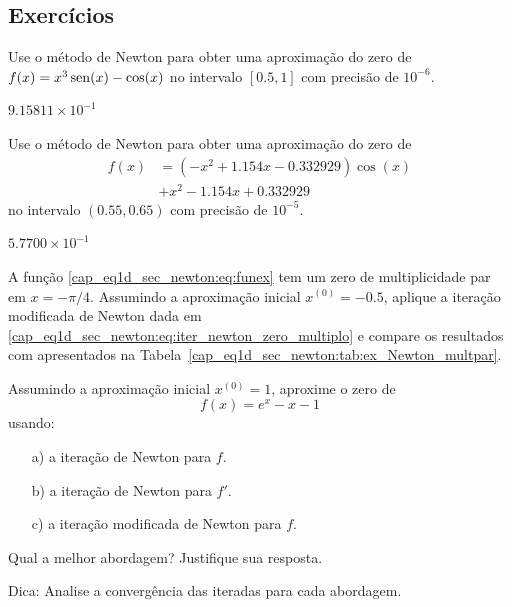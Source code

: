 \subsection*{Exercícios}

\begin{exer}\label{exer:Newton_1}
  Use o método de Newton para obter uma aproximação do zero de $f(x)=x^3\operatorname{sen}(x)-\cos(x)$ no intervalo $[0.5, 1]$ com precisão de $10^{-6}$.
\end{exer}
\begin{resp}
  $9.15811\times 10^{-1}$
\end{resp}

\begin{exer}\label{exer:Newton_multpar}
  Use o método de Newton para obter uma aproximação do zero de
  \begin{equation}
    \begin{aligned}
      f(x) &= (-x^2+1.154x-0.332929)\cos(x) \\
           &+ x^2 - 1.154x + 0.332929
    \end{aligned}
\end{equation}
no intervalo $(0.55, 0.65)$ com precisão de $10^{-5}$.
\end{exer}
\begin{resp}
  $5.7700\times 10^{-1}$
\end{resp}

\begin{exer}\label{cap_eq1d_sec_newton:exer:iter_newton_zeros_multiplos}
  A função \eqref{cap_eq1d_sec_newton:eq:funex} tem um zero de multiplicidade par em $x=-\pi/4$. Assumindo a aproximação inicial $x^{(0)} = -0.5$, aplique a iteração modificada de Newton dada em \eqref{cap_eq1d_sec_newton:eq:iter_newton_zero_multiplo} e compare os resultados com apresentados na Tabela~\ref{cap_eq1d_sec_newton:tab:ex_Newton_multpar}.
\end{exer}

\begin{exer}
  Assumindo a aproximação inicial $x^{(0)} = 1$, aproxime o zero de
  \begin{equation}
    f(x) = e^x - x - 1
  \end{equation}
  usando:
  \begin{enumerate}[a)]
  \item[a)] a iteração de Newton para $f$.
  \item[b)] a iteração de Newton para $f'$.
  \item[c)] a iteração modificada de Newton para $f$.
  \end{enumerate}
  Qual a melhor abordagem? Justifique sua resposta.
\end{exer}
\begin{resp}
  Dica: Analise a convergência das iteradas para cada abordagem.
\end{resp}


